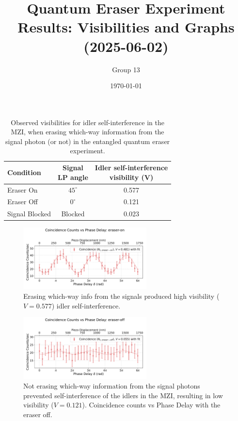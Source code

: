 \documentclass{article}
\title{Quantum Eraser Experiment Results: Visibilities and Graphs (2025-06-02)}
\author{Group 13} %
\date{\today}
\begin{document}
\pagestyle{empty} %

%

\begin{table}[h!]
\centering
\begin{tabular}{lcc}
\toprule
Condition & \makecell{Signal \\ LP angle} & \makecell{Idler self-interference \\ visibility (V)} \\
\midrule
Eraser On          & $45^\circ$  & 0.577 \\
Eraser Off         & $0^\circ$ & 0.121 \\
Signal Blocked     & Blocked & 0.023 \\
\bottomrule
\end{tabular}
\caption{
  Observed visibilities for idler self-interference in the MZI,
  when erasing which-way information from the signal photon (or not)
  in the entangled quantum eraser experiment.}
\end{table}

\begin{figure}[h!]
\centering
\includegraphics[width=0.6\textwidth]{coincidence_counts_eraser_on.pdf}
\caption{
  Erasing which-way info from the signals
  produced high visibility ($V=0.577$) idler self-interference.
}
\end{figure}


\begin{figure}[h!]
\centering
\includegraphics[width=0.6\textwidth]{coincidence_counts_eraser_off.pdf}
\caption{
  Not erasing which-way information from the signal photons
  prevented self-interference of the idlers in the MZI,
  resulting in low visibility ($V=0.121$).
  Coincidence counts vs Phase Delay with the eraser off.
}
\end{figure}
\end{document}
